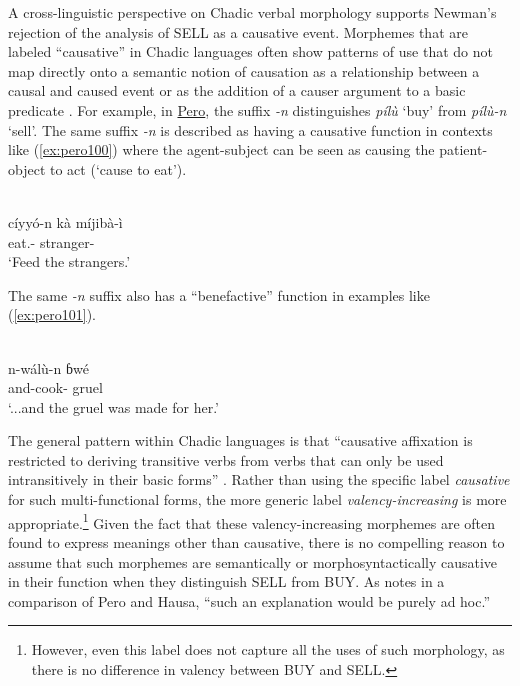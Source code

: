 A cross-linguistic perspective on Chadic verbal morphology supports Newman's rejection of the analysis of SELL as a causative event. Morphemes that are labeled ``causative'' in Chadic languages often show patterns of use that do not map directly onto a semantic notion of causation as a relationship between a causal and caused event \citep{kulikovCausatives2001} or as the addition of a causer argument to a basic predicate \citep{dixonTypologyCausativesForm2000}. For example, in \hyperref[pero]{Pero}, the suffix \textit{-n} distinguishes \textit{pílù} `buy' from \textit{pílù-n} `sell'. The same suffix \textit{-n} is described as having a causative function in contexts like (\ref{ex:pero100}) where the agent-subject can be seen as causing the patient-object to act (`cause to eat'). 

\ea\label{ex:pero100}
 \\
\gll cíyyó-n kà míjibà-ì \\
eat.-  stranger- \\
\glt `Feed the strangers.'
\z 

The same \textit{-n} suffix also has a ``benefactive'' function in examples like (\ref{ex:pero101}). 

\ea\label{ex:pero101}
 \\
\gll n-wálù-n ɓwé \\
and-cook- gruel \\
\glt `...and the gruel was made for her.'
\z 

The general pattern within Chadic languages is that ``causative affixation is restricted to deriving transitive verbs from verbs that can only be used intransitively in their basic forms'' \citep[287]{schuhChadicCornucopia2017}. Rather than using the specific label \textit{causative} for such multi-functional forms, the more generic label \textit{valency-increasing} is more appropriate.\footnote{However, even this label does not capture all the uses of such morphology, as there is no difference in valency between BUY and SELL.} Given the fact that these valency-increasing morphemes are often found to express meanings other than causative, there is no compelling reason to assume that such morphemes are semantically or morphosyntactically causative in their function when they distinguish SELL from BUY. As \citet[175]{frajzyngierGrammarPero1989} notes in a comparison of Pero and Hausa, ``such an explanation would be purely ad hoc.''

